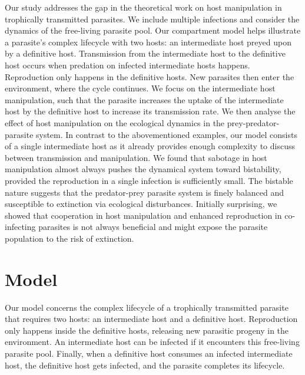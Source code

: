 \documentclass[a4paper]{scrartcl}
\begin{document}
\color{black}Our study addresses the gap in the theoretical work on host manipulation in trophically transmitted parasites.
We include multiple infections and consider the dynamics of the free-living parasite pool. 
Our compartment model helps illustrate a parasite's complex lifecycle with two hosts: an intermediate host preyed upon by a definitive host. 
Transmission from the intermediate host to the definitive host occurs when predation on infected intermediate hosts happens. 
Reproduction only happens in the definitive hosts. 
New parasites then enter the environment, where the cycle continues. 
We focus on the intermediate host manipulation, such that the parasite increases the uptake of the intermediate host by the definitive host to increase its transmission rate. 
We then analyse the effect of host manipulation on the ecological dynamics in the prey-predator-parasite system. 
In contrast to the abovementioned examples, our model consists of a single intermediate host as it already provides enough complexity to discuss between transmission and manipulation.
We found that sabotage in host manipulation almost always pushes the dynamical system toward bistability, provided the reproduction in a single infection is sufficiently small. 
The bistable nature suggests that the predator-prey parasite system is finely balanced and susceptible to extinction via ecological disturbances. 
Initially surprising, we showed that cooperation in host manipulation and enhanced reproduction in co-infecting parasites is not always beneficial and might expose the parasite population to the risk of extinction.

\section*{Model}

Our model concerns the complex lifecycle of a trophically transmitted parasite that requires two hosts: an intermediate host and a definitive host. 
Reproduction only happens inside the definitive hosts, releasing new parasitic progeny in the environment. 
An intermediate host can be infected if it encounters this free-living parasite pool. 
Finally, when a definitive host consumes an infected intermediate host, the definitive host gets infected, and the parasite completes its lifecycle.
\end{document}
